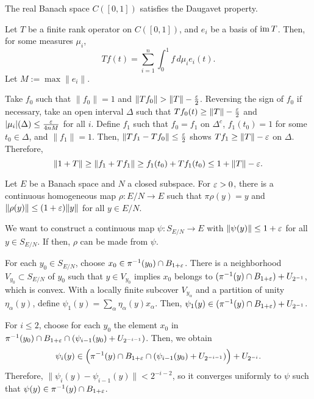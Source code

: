 \documentclass{../../large}
\begin{document}
\begin{prb}
\begin{parts}
\item The real Banach space $C([0,1])$ satisfies the Daugavet property.
\end{parts}
\end{prb}
\begin{pf}
Let $T$ be a finite rank operator on $C([0,1])$, and $e_i$ be a basis of $\operatorname{im} T$.
Then, for some measures $\mu_i$,
\[Tf(t)=\sum_{i=1}^n\int_0^1f\,d\mu_ie_i(t).\]
Let $M:=\max\|e_i\|$.

Take $f_0$ such that $\|f_0\|=1$ and $\|Tf_0\|>\|T\|-\frac\e2$.
Reversing the sign of $f_0$ if necessary, take an open interval $\Delta$ such that $Tf_0(t)\ge\|T\|-\frac{\varepsilon}2$ and $|\mu_i|(\Delta)\le\frac{\varepsilon}{4nM}$ for all $i$.
Define $f_1$ such that $f_0=f_1$ on $\Delta^c$, $f_1(t_0)=1$ for some $t_0\in\Delta$, and $\|f_1\|=1$.
Then, $\|Tf_1-Tf_0\|\le\frac{\varepsilon}2$ shows $Tf_1\ge\|T\|-\varepsilon$ on $\Delta$.
Therefore,
\[\|1+T\|\ge\|f_1+Tf_1\|\ge f_1(t_0)+Tf_1(t_0)\le1+\|T\|-\varepsilon.\]
\end{pf}

\begin{prb}
Let $E$ be a Banach space and $N$ a closed subspace.
For $\varepsilon>0$, there is a continuous homogeneous map $\rho:E/N\to E$ such that $\pi\rho(y)=y$ and $\|\rho(y)\|\le(1+\varepsilon)\|y\|$ for all $y\in E/N$.
\end{prb}
\begin{pf}
We want to construct a continuous map $\psi:S_{E/N}\to E$ with $\|\psi(y)\|\le1+\varepsilon$ for all $y\in S_{E/N}$.
If then, $\rho$ can be made from $\psi$.

For each $y_0\in S_{E/N}$, choose $x_0\in\pi^{-1}(y_0)\cap B_{1+\varepsilon}$.
There is a neighborhood $V_{y_0}\subset S_{E/N}$ of $y_0$ such that $y\in V_{y_0}$ implies $x_0$ belongs to $(\pi^{-1}(y)\cap B_{1+\varepsilon})+U_{2^{-1}}$, which is convex.
With a locally finite subcover $V_{y_\alpha}$ and a partition of unity $\eta_\alpha(y)$, define $\psi_1(y)=\sum_\alpha\eta_\alpha(y)x_\alpha$.
Then, $\psi_1(y)\in(\pi^{-1}(y)\cap B_{1+\varepsilon})+U_{2^{-1}}$.

For $i\le2$, choose for each $y_0$ the element $x_0$ in $\pi^{-1}(y_0)\cap B_{1+\varepsilon}\cap(\psi_{i-1}(y_0)+U_{2^{-{i-1}}})$.
Then, we obtain
\[\psi_i(y)\in\Bigl(\pi^{-1}(y)\cap B_{1+\varepsilon}\cap(\psi_{i-1}(y_0)+U_{2^{-{i-1}}})\Bigr)+U_{2^{-i}}.\]
Therefore, $\|\psi_i(y)-\psi_{i-1}(y)\|<2^{-{i-2}}$, so it converges uniformly to $\psi$ such that $\psi(y)\in\pi^{-1}(y)\cap B_{1+\varepsilon}$.
\end{pf}
\end{document}
